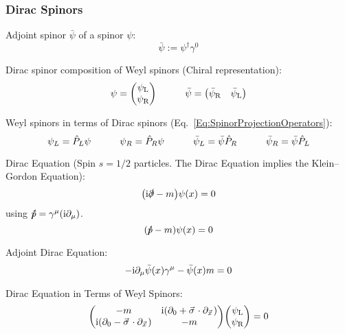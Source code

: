 		\subsubsection{Dirac Spinors}
			Adjoint spinor $\bar{\psi}$ of a spinor $\psi$:
			\begin{equation}
				\bar{\psi} := \psi^{\dagger} \gamma^0
			\end{equation}

			\noindent
			Dirac spinor composition of Weyl spinors (Chiral representation):
			\begin{equation}
				\psi = \mqty(\psi_\text{L} \\ \psi_\text{R})
				\hsp
				\bar{\psi} = \mqty(\bar{\psi}_\text{R} & \bar{\psi}_\text{L})
			\end{equation}

			\noindent
			Weyl spinors in terms of Dirac spinors (Eq.~\ref{Eq:SpinorProjectionOperators}):
			\begin{equation}
				\psi_L = \hat{P}_L \psi \hspace{30pt} \psi_R = \hat{P}_R \psi
				\hspace{30pt}
				\bar{\psi}_L = \bar{\psi} \hat{P}_R \hspace{30pt} \bar{\psi}_R = \bar{\psi} \hat{P}_L
			\end{equation}

			\noindent
			Dirac Equation (Spin $s=1/2$ particles. The Dirac Equation implies the Klein--Gordon Equation):
			\begin{equation}
				\qty(\mathrm{i}\slashed{\partial} - m ) \psi\qty(x) = 0
			\end{equation}
			using $\slashed{\hat{p}} = \gamma^\mu(\mathrm{i}\partial_\mu)$.
			\begin{equation}
				\qty(\slashed{\hat{p}} - m) \psi\qty(x) = 0
			\end{equation}

			\noindent
			Adjoint Dirac Equation:
			\begin{equation}
				-\mathrm{i} \partial_\mu \bar{\psi}(x)\gamma^\mu-\bar\psi(x)m = 0
			\end{equation}

			\noindent
			Dirac Equation in Terms of Weyl Spinors:
			\begin{equation}
				\label{Eq:DiracInTermsOfWeylSpinors}
				\mqty( -m & \i (\partial_0 + \vec{\sigma}\cdot\partial_{\vec{x}}) \\ \i (\partial_0 - \vec{\sigma}\cdot\partial_{\vec{x}}) & -m ) \mqty( \psi_\text{L} \\ \psi_\text{R} ) = 0
			\end{equation}

